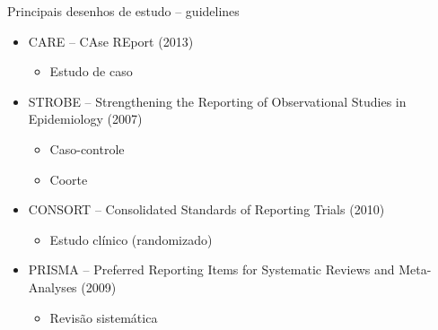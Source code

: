 \documentclass{beamer}
\begin{document}
\begin{frame}{Principais desenhos de estudo -- guidelines}
  \begin{itemize}
    \footnotesize
  \item CARE -- {\scriptsize CAse REport (2013)}
    \begin{itemize}
    \item Estudo de caso
    \end{itemize}
  \end{itemize}
  \begin{itemize}
    \footnotesize
  \item STROBE -- {\scriptsize Strengthening the Reporting of Observational Studies in Epidemiology (2007)}
    \begin{itemize}
    \item Caso-controle
    \item Coorte
    \end{itemize}
  \end{itemize}
  \begin{itemize}
  \item CONSORT -- {\scriptsize Consolidated Standards of Reporting Trials (2010)}
    \begin{itemize}
      \footnotesize
    \item Estudo clínico (randomizado)
    \end{itemize}
  \end{itemize}
  \begin{itemize}
    \footnotesize
  \item<2-> PRISMA -- {\scriptsize Preferred Reporting Items for Systematic Reviews and Meta-Analyses (2009)}
    \begin{itemize}
    \item Revisão sistemática
    \end{itemize}
  \end{itemize}
\end{frame}
\end{document}
